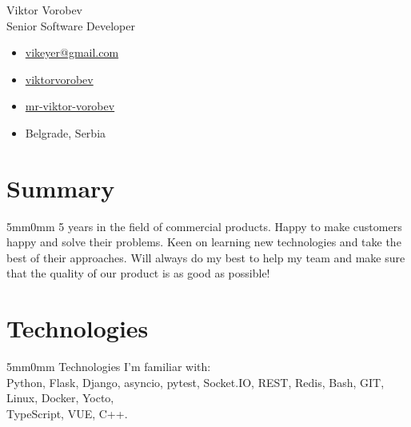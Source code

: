 \documentclass[10pt]{article}
\newcommand{\lmvalue}{5mm}
\newcommand{\rmvalue}{0mm}
\begin{document}
    \begin{minipage}[t]{0.78\linewidth}
    {\fontsize{28pt}{28pt}\selectfont Viktor Vorobev}
        \\[1em]
        {\color{gray}\fontsize{16pt}{16pt}\selectfont Senior Software Developer}
    \end{minipage}
    \hfill%
    \begin{minipage}[t]{0.24\linewidth}
        \begin{flushleft}
            \begin{itemize}
                \item[\color{cyan}\faEnvelope] \href{mailto:vikeyer@gmail.com}{vikeyer@gmail.com}
                \item[\color{cyan}\faGithub] \href{https://github.com/viktorvorobev}{viktorvorobev}
                \item[\color{cyan}\faLinkedin] \href{https://www.linkedin.com/in/mr-viktor-vorobev/}{mr-viktor-vorobev}
                \item[\faBuildingO] Belgrade, Serbia
            \end{itemize}
        \end{flushleft}
    \end{minipage}

    \vspace{3mm}
    \section*{Summary}
    \begin{changemargin}{\lmvalue}{\rmvalue}
        5 years in the field of commercial products.
        Happy to make customers happy and solve their problems.
        Keen on learning new technologies and take the best of their approaches.
        Will always do my best to help my team and make sure that the quality of our product is as good as possible!
    \end{changemargin}
	\section*{Technologies}
	\begin{changemargin}{\lmvalue}{\rmvalue}
	    Technologies I'm familiar with:\\
        Python, Flask, Django, asyncio, pytest, Socket.IO, REST, Redis, Bash, GIT, Linux,
        Docker, Yocto, \\
        TypeScript, VUE, C++.
    \end{changemargin}
\end{document}
